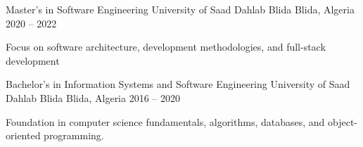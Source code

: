 \begin{cventries}

  \cventry
    {Master's in Software Engineering}
    {University of Saad Dahlab Blida}
    {Blida, Algeria}
    {2020 -- 2022}
    {
      \begin{cvitems}
        \item {Focus on software architecture, development methodologies, and full-stack development}
      \end{cvitems}
    }

  \cventry
    {Bachelor’s in Information Systems and Software Engineering}
    {University of Saad Dahlab Blida}
    {Blida, Algeria}
    {2016 -- 2020}
    {
      \begin{cvitems}
        \item {Foundation in computer science fundamentals, algorithms, databases, and object-oriented programming.}
      \end{cvitems}
    }

\end{cventries}